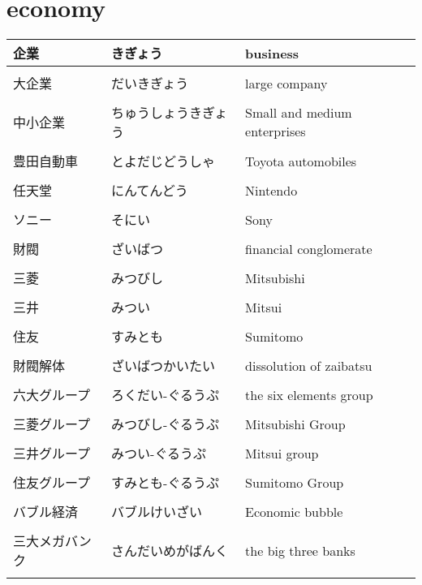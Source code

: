 \documentclass{article}
\newcommand\tabni[1][0.2cm]{\hspace*{#1}}
\begin{document}
\section{ \tabni economy }
\begin{tabular}{ l | l | p{7.5cm} }
企業 & きぎょう & business \\ \hline \\[-1em]
大企業 & だいきぎょう & large company \\ \hline \\[-1em]
中小企業 & ちゅうしょうきぎょう & Small and medium enterprises \\ \hline \\[-1em]
豊田自動車 & とよだじどうしゃ & Toyota automobiles \\ \hline \\[-1em]
任天堂 & にんてんどう & Nintendo \\ \hline \\[-1em]
ソニー & そにい & Sony \\ \hline \\[-1em]
財閥 & ざいばつ & financial conglomerate \\ \hline \\[-1em]
三菱 & みつびし & Mitsubishi \\ \hline \\[-1em]
三井 & みつい & Mitsui \\ \hline \\[-1em]
住友 & すみとも & Sumitomo \\ \hline \\[-1em]
財閥解体 & ざいばつかいたい & dissolution of zaibatsu \\ \hline \\[-1em]
六大グループ & ろくだい-ぐるうぷ　& the six elements group \\ \hline \\[-1em]
三菱グループ & みつびし-ぐるうぷ & Mitsubishi Group \\ \hline \\[-1em]
三井グループ & みつい-ぐるうぷ　& Mitsui group \\ \hline \\[-1em]
住友グループ & すみとも-ぐるうぷ　& Sumitomo Group \\ \hline \\[-1em]
バブル経済 & バブルけいざい & Economic bubble \\ \hline \\[-1em]
三大メガバンク & さんだいめがばんく & the big three banks \\ \hline \\[-1em]

\end{tabular}
\end{document}
